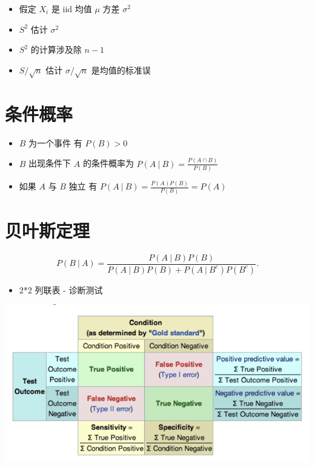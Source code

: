 \documentclass[]{book}
\providecommand{\tightlist}{%
  \setlength{\itemsep}{0pt}\setlength{\parskip}{0pt}}
\begin{document}
\begin{itemize}
  \begin{itemize}
  \tightlist
  \item
    假定 \(X_i\) 是 iid 均值 \(\mu\) 方差 \(\sigma^2\)
  \item
    \(S^2\) 估计 \(\sigma^2\)
  \item
    \(S^2\) 的计算涉及除 \(n-1\)
  \item
    \(S / \sqrt{n}\) 估计 \(\sigma / \sqrt{n}\) 是均值的标准误
  \end{itemize}
\end{itemize}

\hypertarget{ux6761ux4ef6ux6982ux7387}{%
\section{条件概率}\label{ux6761ux4ef6ux6982ux7387}}

\begin{itemize}
\tightlist
\item
  \(B\) 为一个事件 有 \(P(B) > 0\)
\item
  \(B\) 出现条件下 \(A\) 的条件概率为 \(P(A ~|~ B) = \frac{P(A \cap B)}{P(B)}\)
\item
  如果 \(A\) 与 \(B\) 独立 有 \(P(A ~|~ B) = \frac{P(A) P(B)}{P(B)} = P(A)\)
\end{itemize}

\hypertarget{ux8d1dux53f6ux65afux5b9aux7406}{%
\section{贝叶斯定理}\label{ux8d1dux53f6ux65afux5b9aux7406}}

\[
P(B ~|~ A) = \frac{P(A ~|~ B) P(B)}{P(A ~|~ B) P(B) + P(A ~|~ B^c)P(B^c)}.
\]

\begin{itemize}
\tightlist
\item
  2*2 列联表 - 诊断测试
\end{itemize}

\includegraphics[width=11.74in]{images/error}
\end{document}
